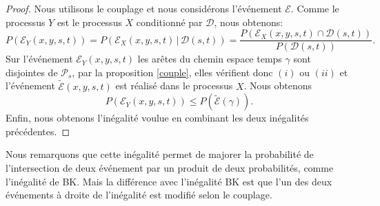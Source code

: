 \documentclass[titlepage,a4paper,12pt]{article}
\newcounter{th}
\newcounter{propo}
\begin{document}
\begin{proof}
Nous utilisons le couplage et nous considérons l'événement $\mathcal{E}$. Comme le processus $Y$ est le processus $X$ conditionné par $\mathcal{D}$, nous obtenons:
$$P(\mathcal{E}_Y(x,y,s,t)) = P\left(\mathcal{E}_X(x,y,s,t)\,\big|\,\mathcal{D}(s,t)\right) =  \frac{P\left(\mathcal{E}_X(x,y,s,t)\cap\mathcal{D}(s,t)\right)}{P(\mathcal{D}(s,t))}.
$$
Sur l'événement $\mathcal{E}_Y(x,y,s,t)$ les arêtes du chemin espace temps $\gamma$ sont disjointes de $\mathcal{P}_s$, par la proposition \ref{couple}, elles vérifient donc $(i)$ ou $(ii)$ et l'événement $\widetilde{\mathcal{E}}(x,y,s,t)$ est réalisé dans le processus $X$. Nous obtenons
$$ P(\mathcal{E}_Y(x,y,s,t))\leqslant P\left(\widetilde{\mathcal{E}}(\gamma)\right).
$$
Enfin, nous obtenons l'inégalité voulue en combinant les deux inégalités précédentes.
\end{proof}
Nous remarquons que cette inégalité permet de majorer la probabilité de l'intersection de deux événement par un produit de deux probabilités, comme l'inégalité de BK. Mais la différence avec l'inégalité BK est que l'un des deux événements à droite de l'inégalité est modifié selon le couplage. 
\end{document}
